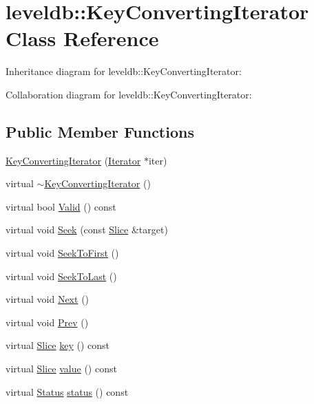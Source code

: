 \hypertarget{classleveldb_1_1_key_converting_iterator}{\section{leveldb\-:\-:Key\-Converting\-Iterator Class Reference}
\label{classleveldb_1_1_key_converting_iterator}
}


Inheritance diagram for leveldb\-:\-:Key\-Converting\-Iterator\-:


Collaboration diagram for leveldb\-:\-:Key\-Converting\-Iterator\-:
\subsection*{Public Member Functions}
\begin{DoxyCompactItemize}
\item 
\hyperlink{classleveldb_1_1_key_converting_iterator_a7b5c28a94749f2e02ecc9021bb9adb51}{Key\-Converting\-Iterator} (\hyperlink{classleveldb_1_1_iterator}{Iterator} $\ast$iter)
\item 
virtual \hyperlink{classleveldb_1_1_key_converting_iterator_a2a774b0a90768168394ca0c35ba3a87e}{$\sim$\-Key\-Converting\-Iterator} ()
\item 
virtual bool \hyperlink{classleveldb_1_1_key_converting_iterator_a941cabf2e0b1c9647faa037b7ad55668}{Valid} () const 
\item 
virtual void \hyperlink{classleveldb_1_1_key_converting_iterator_a6af9b763a5831c2fdcd8c3bebfef6ae4}{Seek} (const \hyperlink{classleveldb_1_1_slice}{Slice} \&target)
\item 
virtual void \hyperlink{classleveldb_1_1_key_converting_iterator_a56a6b7b97747d5e33981a66c28670cc9}{Seek\-To\-First} ()
\item 
virtual void \hyperlink{classleveldb_1_1_key_converting_iterator_a9db639879c442a67234fc345887b19fc}{Seek\-To\-Last} ()
\item 
virtual void \hyperlink{classleveldb_1_1_key_converting_iterator_a6b468c158da3f6abbc697f7728811da8}{Next} ()
\item 
virtual void \hyperlink{classleveldb_1_1_key_converting_iterator_adff607836b7b3d117a524b3d440bc55a}{Prev} ()
\item 
virtual \hyperlink{classleveldb_1_1_slice}{Slice} \hyperlink{classleveldb_1_1_key_converting_iterator_a46402aaa27d57c5b2bee4f560c2dc04b}{key} () const 
\item 
virtual \hyperlink{classleveldb_1_1_slice}{Slice} \hyperlink{classleveldb_1_1_key_converting_iterator_aa7a0281f93fbd520bf54d94bac77197a}{value} () const 
\item 
virtual \hyperlink{classleveldb_1_1_status}{Status} \hyperlink{classleveldb_1_1_key_converting_iterator_a10d0f5b6b83bc967ba5c73d6bfc919f3}{status} () const 
\end{DoxyCompactItemize}
